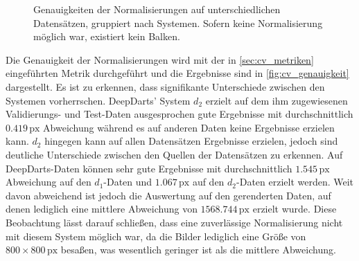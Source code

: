 \Similarities

\begin{figure}
    \centering
    \caption{Genauigkeiten der Normalisierungen auf unterschiedlichen Datensätzen, gruppiert nach Systemen. Sofern keine Normalisierung möglich war, existiert kein Balken.}
    \label{fig:cv_genauigkeit}
\end{figure}

Die Genauigkeit der Normalisierungen wird mit der in \autoref{sec:cv_metriken} eingeführten Metrik durchgeführt und die Ergebnisse sind in \autoref{fig:cv_genauigkeit} dargestellt. Es ist zu erkennen, dass signifikante Unterschiede zwischen den Systemen vorherrschen. DeepDarts' System $d_2$ erzielt auf dem ihm zugewiesenen Validierungs- und Test-Daten ausgesprochen gute Ergebnisse mit durchschnittlich $0.419\,\text{px}$ Abweichung während es auf anderen Daten keine Ergebnisse erzielen kann. $d_2$ hingegen kann auf allen Datensätzen Ergebnisse erzielen, jedoch sind deutliche Unterschiede zwischen den Quellen der Datensätzen zu erkennen. Auf DeepDarts-Daten können sehr gute Ergebnisse mit durchschnittlich $1.545\,\text{px}$ Abweichung auf den $d_1$-Daten und $1.067\,\text{px}$ auf den $d_2$-Daten erzielt werden. Weit davon abweichend ist jedoch die Auswertung auf den gerenderten Daten, auf denen lediglich eine mittlere Abweichung von $1568.744\,\text{px}$ erzielt wurde.
Diese Beobachtung lässt darauf schließen, dass eine zuverlässige Normalisierung nicht mit diesem System möglich war, da die Bilder lediglich eine Größe von $800 \times 800\,\text{px}$ besaßen, was wesentlich geringer ist als die mittlere Abweichung.

